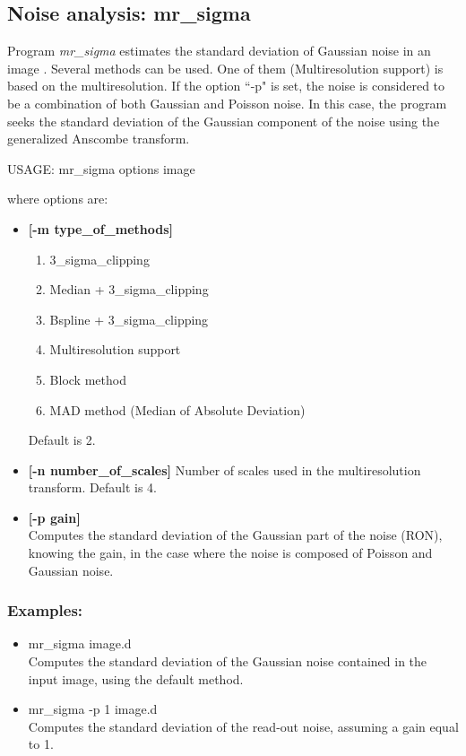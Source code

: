 \subsection{Noise analysis: mr\_sigma}
Program 
{\em mr\_sigma} estimates the standard deviation of  Gaussian 
noise in an image \cite{starck:sta98_3}. Several methods can 
be used. One of them 
(Multiresolution support) is based on the multiresolution.
If the option ``-p" is set, the noise is considered to be 
a combination of both Gaussian and Poisson noise. In this 
case, the program seeks the standard deviation of the Gaussian
component of the noise using the generalized Anscombe transform.
{\bf
\begin{center}
 USAGE: mr\_sigma options image 
\end{center}}
where options are:
 \begin{itemize}
 \baselineskip=0.4truecm
\itemsep=0.1truecm
\item {\bf [-m type\_of\_methods]}
{\small 
\begin{enumerate}
 \item 3\_sigma\_clipping 
 \item Median + 3\_sigma\_clipping  
 \item Bspline + 3\_sigma\_clipping 
 \item Multiresolution support 
 \item Block method 
 \item MAD method (Median of Absolute Deviation) 
\end{enumerate}
}
Default is 2.
\item {\bf [-n number\_of\_scales]}
Number of scales used in the multiresolution transform.
Default is 4.
\item {\bf [-p gain]} \\
Computes the standard deviation of the Gaussian part of the 
noise (RON), knowing the gain, in the case where the noise is
composed of Poisson and Gaussian noise.
\end{itemize}
\subsubsection*{Examples:}
\begin{itemize}
\item mr\_sigma image.d  \\
Computes the standard deviation of the Gaussian noise contained in the
input image, using the default method.
\item mr\_sigma -p 1 image.d  \\
Computes the standard deviation of the read-out noise, assuming a gain
equal to 1.
\end{itemize}

